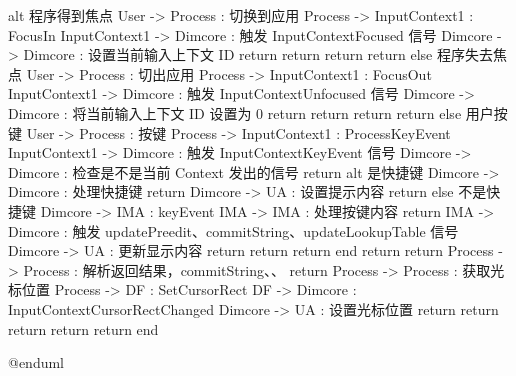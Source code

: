 \documentclass{utart}
\begin{document}
\begin{plantuml}
        alt 程序得到焦点
            User -> Process : 切换到应用
                Process -> InputContext1 : FocusIn
                    InputContext1 -> Dimcore : 触发 InputContextFocused 信号
                        Dimcore -> Dimcore : 设置当前输入上下文 ID
                        return
                    return
                return
            return
        else 程序失去焦点
            User -> Process : 切出应用
                Process -> InputContext1 : FocusOut
                    InputContext1 -> Dimcore : 触发 InputContextUnfocused 信号
                        Dimcore -> Dimcore : 将当前输入上下文 ID 设置为 0
                        return
                    return
                return
            return
        else 用户按键
            User -> Process : 按键
                Process -> InputContext1 : ProcessKeyEvent
                    InputContext1 -> Dimcore : 触发 InputContextKeyEvent 信号
                        Dimcore -> Dimcore : 检查是不是当前 Context 发出的信号
                        return
                        alt 是快捷键
                            Dimcore -> Dimcore : 处理快捷键
                            return
                            Dimcore -> UA : 设置提示内容
                            return
                        else 不是快捷键
                            Dimcore -> IMA : keyEvent
                                IMA -> IMA : 处理按键内容
                                return
                                IMA -> Dimcore : 触发 updatePreedit、commitString、updateLookupTable 信号
                                    Dimcore -> UA : 更新显示内容
                                    return
                                return
                            return
                        end
                    return
                return
                Process -> Process : 解析返回结果， commitString、\nupdatePreedit、\nforwardKey
                return
                Process -> Process : 获取光标位置
                    Process -> DF : SetCursorRect
                        DF -> Dimcore : InputContextCursorRectChanged
                            Dimcore -> UA : 设置光标位置
                            return
                        return
                    return
                return
            return
        end

        @enduml
        \end{plantuml}
\end{document}

